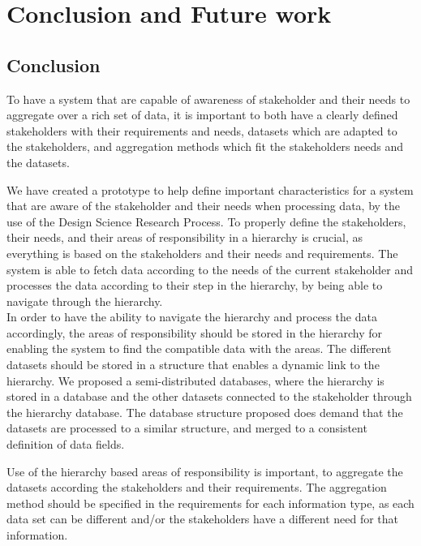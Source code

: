 \chapter{Conclusion and Future work}
\label{chapter:conclusion}

\section{Conclusion} %
\label{sec:conclusion}
To have a system that are capable of awareness of stakeholder and their needs
to aggregate over a rich set of data, it is important to both have a clearly
defined stakeholders with their requirements and needs, datasets which are 
adapted to the stakeholders, and aggregation methods which fit the 
stakeholders needs and the datasets. 

We have created a prototype to help define important characteristics for a
system that are aware of the stakeholder and their needs when processing data,
by the use of the Design Science Research Process. To properly define the 
stakeholders, their needs, and their areas of responsibility in a hierarchy is 
crucial, as everything is based on the stakeholders and their needs and 
requirements. The system is able to fetch data according to the needs of the 
current stakeholder and processes the data according to their step in the
hierarchy, by being able to navigate through the hierarchy. \\

In order to have the ability to navigate the hierarchy and process the data 
accordingly, the areas of responsibility should be stored in the hierarchy for 
enabling the system to find the compatible data with the areas. The different
datasets should be stored in a structure that enables a dynamic link to the
hierarchy. We proposed a semi-distributed databases, where the hierarchy is
stored in a database and the other datasets connected to the stakeholder
through the hierarchy database. The database structure proposed does demand
that the datasets are processed to a similar structure, and merged to a
consistent definition of data fields. 

Use of the hierarchy based areas of responsibility is important, to aggregate 
the datasets according the stakeholders and their requirements. The 
aggregation method should be specified in the requirements for each 
information type, as each data set can be different and/or the stakeholders 
have a different need for that information.


